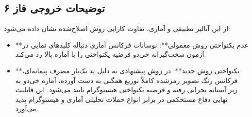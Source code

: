 \subsection*{توضیحات خروجی فاز ۶}
از این آنالیز تطبیقی و آماری، تفاوت کارایی روش اصلاح‌شده نشان داده می‌شود:
\begin{itemize}
    \item **عدم یکنواختی روش  معمولی**: نوسانات فرکانس آماری دنباله کلیدهای نمایی در آزمون سخت‌گیرانه خی‌دو فرضیه یکنواختی را با آماره بالا رد می‌کند.
    \item **یکنواختی روش جدید**: در روش پیشنهادی  به دلیل پد یک‌بار مصرف پیمانه‌ای، فرکانس رنگ تصویر رمزشده کاملاً توزیع همگنی به دست آورده، آماره خی‌دو به زیر آستانه بحرانی رفته و فرضیه یکنواختی هیستوگرام تایید می‌شود. این قابلیت نهایی دفاع مستحکمی در برابر انواع حملات تحلیلی آماری و هیستوگرام پدید می‌آورد.
\end{itemize}
